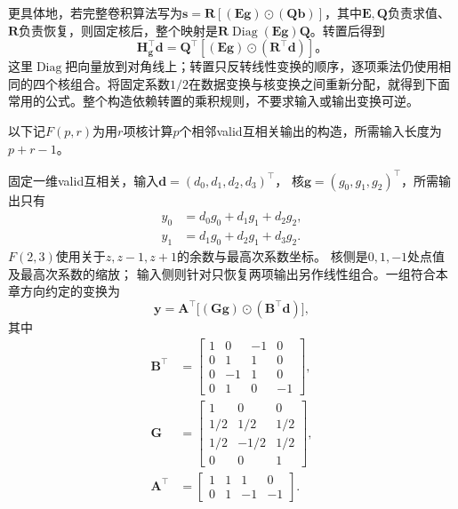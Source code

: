 更具体地，若完整卷积算法写为$\bm s=\bm R[(\bm E\bm g)\odot(\bm Q\bm b)]$，其中$\bm E,\bm Q$负责求值、$\bm R$负责恢复，则固定核后，整个映射是$\bm R\operatorname{Diag}(\bm E\bm g)\bm Q$。转置后得到
\[
  \bm H_{\bm g}^\top\bm d
    =\bm Q^\top[(\bm E\bm g)\odot(\bm R^\top\bm d)]\text{。}
\]
这里$\operatorname{Diag}$把向量放到对角线上；转置只反转线性变换的顺序，逐项乘法仍使用相同的四个核组合。将固定系数$1/2$在数据变换与核变换之间重新分配，就得到下面常用的公式。整个构造依赖转置的乘积规则，不要求输入或输出变换可逆。

以下记$F(p,r)$为用$r$项核计算$p$个相邻valid互相关输出的构造，所需输入长度为$p+r-1$。

\begin{example}
  \label{ex:signal-analysis-winograd-f23}
  固定一维valid互相关，输入$\bm d=(d_0,d_1,d_2,d_3)^\top$，
  核$\bm g=(g_0,g_1,g_2)^\top$，所需输出只有
  \begin{align*}
    y_0&=d_0g_0+d_1g_1+d_2g_2,\\
    y_1&=d_1g_0+d_2g_1+d_3g_2.
  \end{align*}
  $F(2,3)$使用关于$z,z-1,z+1$的余数与最高次系数坐标。
  核侧是$0,1,-1$处点值及最高次系数的缩放；
  输入侧则针对只恢复两项输出另作线性组合。一组符合本章方向约定的变换为
  \begin{equation}
    \bm y=\bm A^\top\bigl[(\bm G\bm g)\odot(\bm B^\top\bm d)\bigr],
    \label{eq:signal-analysis-winograd-f23}
  \end{equation}
\BookEquationAliases{\label{eq:cnn-winograd-matrix-a}
\label{eq:cnn-winograd-matrices-bg}
\label{eq:cnn-winograd-recovery-principle}
\label{eq:cnn-winograd-one-dimensional}
\label{eq:cnn-winograd-vector-transform}}
  其中
  \begin{align*}
    \bm B^\top&=\begin{bmatrix}
      1&0&-1&0\\0&1&1&0\\0&-1&1&0\\0&1&0&-1
    \end{bmatrix},\\
    \bm G&=\begin{bmatrix}
      1&0&0\\1/2&1/2&1/2\\1/2&-1/2&1/2\\0&0&1
    \end{bmatrix},\\
    \bm A^\top&=\begin{bmatrix}1&1&1&0\\0&1&-1&-1\end{bmatrix}.

\end{align*}
\end{example}
